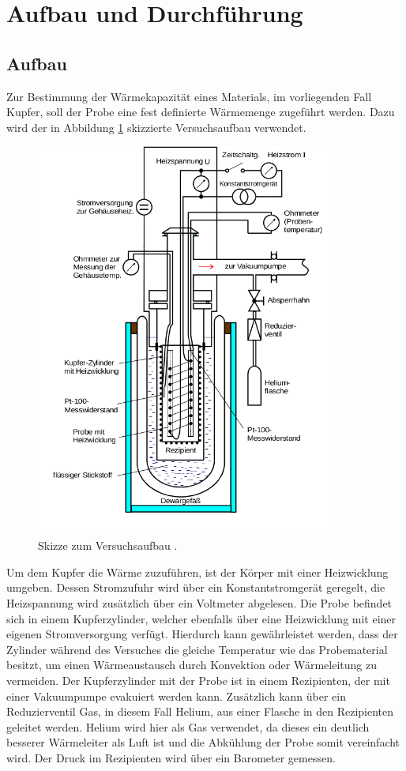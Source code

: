 \section{Aufbau und Durchführung}
\subsection{Aufbau}
\label{sec:Aufbau}

Zur Bestimmung der Wärmekapazität eines Materials, im vorliegenden Fall Kupfer, soll der Probe eine fest definierte Wärmemenge zugeführt werden.
Dazu wird der in Abbildung \ref{fig:aufbau} skizzierte Versuchsaufbau verwendet.

\begin{figure}
  \centering
  \includegraphics[height=13cm]{ressources/aufbau.png}
  \caption{Skizze zum Versuchsaufbau \cite{skript}.}
  \label{fig:aufbau}
\end{figure}

Um dem Kupfer die Wärme zuzuführen, ist der Körper mit einer Heizwicklung umgeben.
Dessen Stromzufuhr wird über ein Konstantstromgerät geregelt, die Heizspannung wird zusätzlich über ein Voltmeter abgelesen.
Die Probe befindet sich in einem Kupferzylinder, welcher ebenfalls über eine Heizwicklung mit einer eigenen Stromversorgung verfügt.
Hierdurch kann gewährleistet werden, dass der Zylinder während des Versuches die gleiche Temperatur wie das Probematerial besitzt, um einen Wärmeaustausch durch Konvektion oder Wärmeleitung zu vermeiden.
Der Kupferzylinder mit der Probe ist in einem Rezipienten, der mit einer Vakuumpumpe evakuiert werden kann.
Zusätzlich kann über ein Reduzierventil Gas, in diesem Fall Helium, aus einer Flasche in den Rezipienten geleitet werden.
Helium wird hier als Gas verwendet, da dieses ein deutlich besserer Wärmeleiter als Luft ist und die Abkühlung der Probe somit vereinfacht wird.
Der Druck im Rezipienten wird über ein Barometer gemessen.

